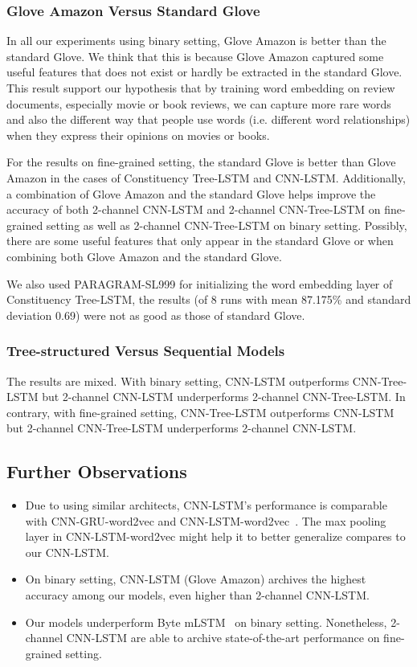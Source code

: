 \subsubsection{Glove Amazon Versus Standard Glove}
In all our experiments using binary setting, Glove Amazon is better than the standard Glove.
We think that this is because Glove Amazon captured some useful features that does not exist or hardly be extracted in the standard Glove.
This result support our hypothesis that by training word embedding on review documents, especially movie or book reviews, we can capture more rare words and also the different way that people use words (i.e. different word relationships) when they express their opinions on movies or books.

For the results on fine-grained setting, the standard Glove is better than Glove Amazon in the cases of Constituency Tree-LSTM and CNN-LSTM.
Additionally, a combination of Glove Amazon and the standard Glove helps improve the accuracy of both 2-channel CNN-LSTM and 2-channel CNN-Tree-LSTM on fine-grained setting as well as 2-channel CNN-Tree-LSTM on binary setting.
Possibly, there are some useful features that only appear in the standard Glove or when combining both Glove Amazon and the standard Glove.

We also used PARAGRAM-SL999 for initializing the word embedding layer of Constituency Tree-LSTM,
the results (of 8 runs with mean 87.175\% and standard deviation 0.69) were not as good as those of standard Glove.
\subsubsection{Tree-structured Versus Sequential Models}
The results are mixed.
With binary setting, CNN-LSTM outperforms CNN-Tree-LSTM but 2-channel CNN-LSTM underperforms 2-channel CNN-Tree-LSTM.
In contrary, with fine-grained setting, CNN-Tree-LSTM
outperforms CNN-LSTM but 2-channel CNN-Tree-LSTM underperforms 2-channel CNN-LSTM.
\subsection{Further Observations}
\begin{itemize}
	\item Due to using similar architects, CNN-LSTM's performance is comparable with CNN-GRU-word2vec and CNN-LSTM-word2vec~\cite{cnn-rnn}.
	The max pooling layer in CNN-LSTM-word2vec might help it to better generalize compares to our CNN-LSTM.
	\item On binary setting, CNN-LSTM (Glove Amazon) archives the highest accuracy among our models, even higher than 2-channel CNN-LSTM.  
	\item Our models underperform Byte mLSTM~\cite{mlstm} on binary setting.
	Nonetheless, 2-channel CNN-LSTM are able to archive state-of-the-art performance on fine-grained setting.
\end{itemize}
